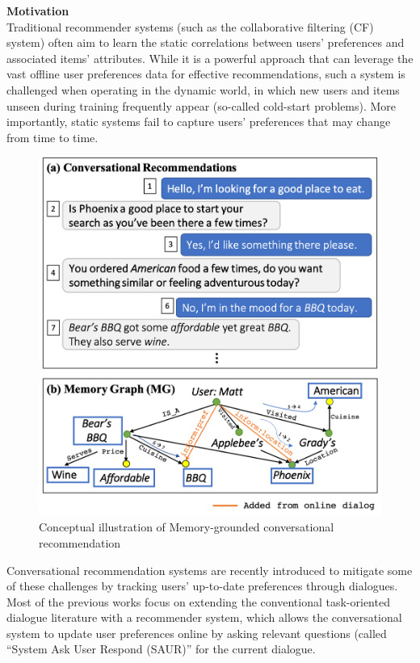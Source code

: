 \textbf{Motivation}\\
Traditional recommender systems (such as the collaborative filtering (CF) system) often aim to learn the static correlations between users' preferences and associated items' attributes.
While it is a powerful approach that can leverage the vast offline user preferences data for effective recommendations, such a system is challenged when operating in the dynamic world, in which new users and items unseen during training frequently appear (so-called cold-start problems).
More importantly, static systems fail to capture users' preferences that may change from time to time.

\begin{figure}[H]
\centering    
\includegraphics[width=0.9\columnwidth]{fig/acl19_teaser.png}
    \caption{Conceptual illustration of Memory-grounded conversational recommendation}
\label{fig:dialogue}
\vspace{-3mm}
\end{figure}

Conversational recommendation systems \cite{li2018towards} are recently introduced to mitigate some of these challenges by tracking users' up-to-date preferences through dialogues.
Most of the previous works focus on extending the conventional task-oriented dialogue literature with a recommender system, which allows the conversational system to update user preferences online by asking relevant questions (called ``System Ask User Respond (SAUR)'' for the current dialogue.

